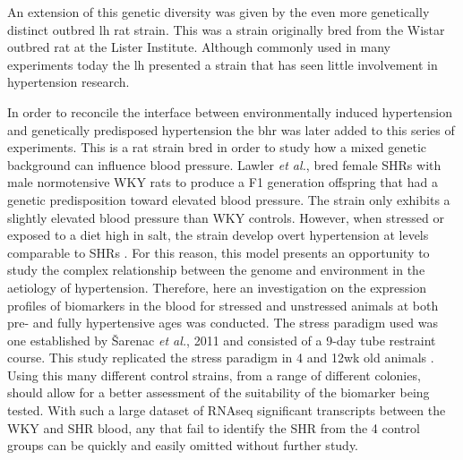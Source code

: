An extension of this genetic diversity was given by the even more genetically distinct outbred \acrshort{lh} rat strain. This was a strain originally bred from the Wistar outbred rat at the Lister Institute. Although commonly used in many experiments today the \acrshort{lh} presented a strain that has seen little involvement in hypertension research.

In order to reconcile the interface between environmentally induced hypertension and genetically predisposed hypertension the \acrfull{bhr} was later added to this series of experiments. This is a rat strain bred in order to study how a mixed genetic background can influence blood pressure. Lawler \textit{et al.}, bred female SHRs with male normotensive WKY rats to produce a F1 generation offspring that had a genetic predisposition toward elevated blood pressure. The strain only exhibits a slightly elevated blood pressure than WKY controls. However, when stressed or exposed to a diet high in salt, the strain develop overt hypertension at levels comparable to SHRs \cite{Sanders1992, Lawler1991}. For this reason, this model presents an opportunity to study the complex relationship between the genome and environment in the aetiology of hypertension. Therefore, here an investigation on the expression profiles of biomarkers in the blood for stressed and unstressed animals at both pre- and fully hypertensive ages was conducted. The stress paradigm used was one established by Šarenac \textit{et al.}, 2011 and consisted of a 9-day tube restraint course. This study replicated the stress paradigm in 4 and 12wk old animals \cite{Sarenac2011}. Using this many different control strains, from a range of different colonies, should allow for a better assessment of the suitability of the biomarker being tested.  With such a large dataset of RNAseq significant transcripts between the WKY and SHR blood, any that fail to identify the SHR from the 4 control groups can be quickly and easily omitted without further study. 

\doublespacing
